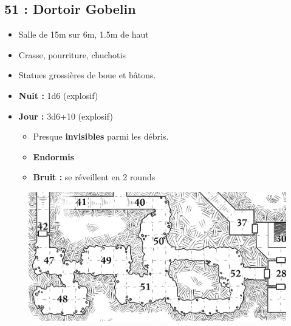 \subsection{51 : Dortoir Gobelin}\label{n3:s51}
\begin{itemize}
  \item Salle de 15m sur 6m, 1.5m de haut 
  \item Crasse, pourriture, chuchotis
  \item Statues grossières de boue et bâtons.
  \item \textbf{Nuit :} 1d6 (explosif) \textbf{}
  \item \textbf{Jour :} 3d6+10 (explosif) \textbf{}
  \begin{itemize}
    \item Presque \textbf{invisibles} parmi les débris.
    \item \textbf{Endormis}
    \item \textbf{Bruit :} se réveillent en 2 rounds
  \end{itemize}
\end{itemize}

\vfill
\pagebreak
\begin{figure}[ht]
  \includegraphics[width=\linewidth]{pics/map_47-52.jpg}
\end{figure}

